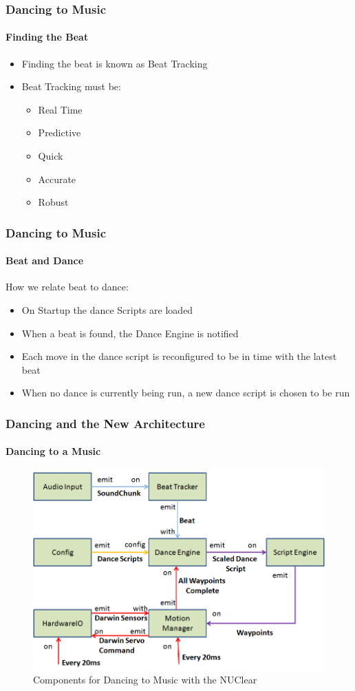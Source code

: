 \documentclass{beamer}
\begin{document}
	\begin{frame}
		\frametitle{Dancing to Music}
		\framesubtitle{Finding the Beat}
		\begin{itemize}
			\item Finding the beat is known as Beat Tracking
			\item Beat Tracking must be:
			\begin{itemize}
				\item Real Time
				\item Predictive
				\item Quick
				\item Accurate
				\item Robust
			\end{itemize}
		\end{itemize}
	\end{frame}	
	\begin{frame}
		\frametitle{Dancing to Music}
		\framesubtitle{Beat and Dance}
		How we relate beat to dance:
		\begin{itemize}
			\item On Startup the dance Scripts are loaded
			\item When a beat is found, the Dance Engine is notified
			\item Each move in the dance script is reconfigured to be in time with the latest beat
			\item When no dance is currently being run, a new dance script is chosen to be run
		\end{itemize}
	\end{frame}	
	\begin{frame}
		\frametitle{Dancing and the New Architecture}
		\framesubtitle{Dancing to a Music}
		\begin{figure}
			\centering
			\includegraphics[scale=.45]{Presentation_Images/dance_audio_new_arc.png}
			\caption{Components for Dancing to Music with the NUClear}
		\end{figure}
	\end{frame}	
\end{document}
